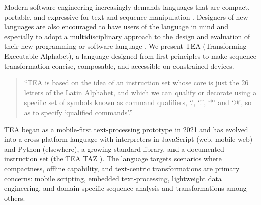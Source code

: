 \documentclass[sigplan,screen]{acmart}
\begin{document}
Modern software engineering increasingly demands languages that are compact, portable, and expressive for text and sequence manipulation \cite{lutalo2024software}. Designers of new languages are also encouraged to have users of the language in mind and especially to adopt a multidisciplinary approach to the design and evaluation of their new programming or software language \cite{coblenz2018interdisciplinary}. We present TEA (Transforming Executable Alphabet), a language designed from first principles to make sequence transformation concise, composable, and accessible on constrained devices.

\begin{quotation}``TEA is based on the idea of an instruction set whose core is just the 26 letters of the Latin Alphabet, and which we can qualify or decorate using a specific set of symbols known as command qualifiers, `.', `!', `*' and `@', so as to specify `qualified commands'.''\end{quotation}

TEA began as a mobile-first text-processing prototype in 2021 and has evolved into a cross-platform language with interpreters in JavaScript (web, mobile-web) and Python (elsewhere), a growing standard library, and a documented instruction set (the TEA TAZ \cite{Lutalo2024TEATAZ}). The language targets scenarios where compactness, offline capability, and text-centric transformations are primary concerns: mobile scripting, embedded text-processing, lightweight data engineering, and domain-specific sequence analysis and transformations among others.
\end{document}
